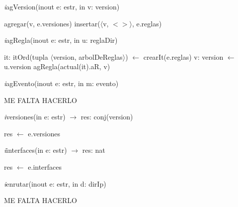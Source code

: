 \vspace{11pt}

\textit{i}agVersion(inout e: estr, in v: version)\\
\begin{algorithm}[H]
\BlankLine
agregar(v, e.versiones)
\BlankLine
insertar($\langle$v, $<>\rangle$, e.reglas)
\end{algorithm}

\vspace{11pt}

\textit{i}agRegla(inout e: estr, in u: reglaDir)\\
\begin{algorithm}[H]
\BlankLine
it: itOrd(tupla $\langle$version, arbolDeReglas$\rangle$) $\leftarrow$ crearIt(e.reglas) 
\BlankLine
v: version $\leftarrow$ u.version
\BlankLine
{}
\BlankLine
agRegla(actual(it).aR, v)
\end{algorithm}

\vspace{11pt}

\textit{i}agEvento(inout e: estr, in m: evento)\\
\begin{algorithm}[H]
ME FALTA HACERLO
\end{algorithm}

\vspace{11pt}

\textit{i}versiones(in e: estr) $\longrightarrow$ res: conj(version)\\
\begin{algorithm}[H]
\BlankLine
res $\leftarrow$ e.versiones
\end{algorithm}

\vspace{11pt}

\textit{i}interfaces(in e: estr) $\longrightarrow$ res: nat\\
\begin{algorithm}[H]
\BlankLine
res $\leftarrow$ e.interfaces
\end{algorithm}

\vspace{11pt}

\textit{i}enrutar(inout e: estr, in d: dirIp)\\
\begin{algorithm}[H]
\BlankLine
ME FALTA HACERLO
\end{algorithm}

\vspace{11pt}

